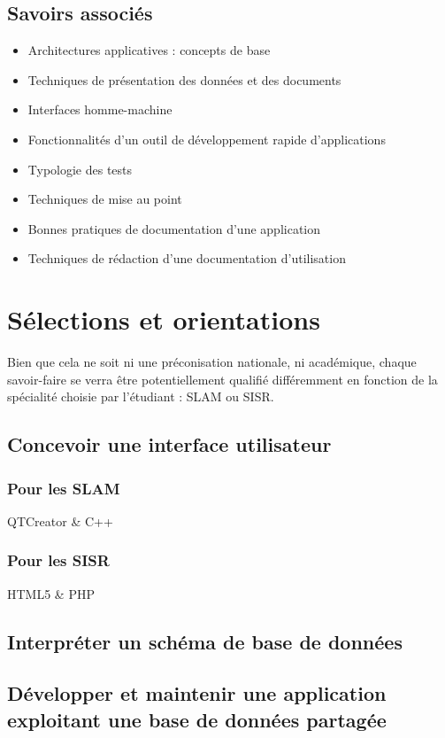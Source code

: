 \documentclass[12pt,a4paper,oneside,titlepage,final]{article}
\begin{document}
\subsection*{Savoirs associés}
\begin{itemize}
    \item Architectures applicatives : concepts de base
    \item Techniques de présentation des données et des documents
    \item Interfaces homme-machine
    \item Fonctionnalités d'un outil de développement rapide
    d'applications
    \item Typologie des tests
    \item Techniques de mise au point
    \item Bonnes pratiques de documentation d'une application
    \item Techniques de rédaction d'une documentation d'utilisation
\end{itemize}


\section{Sélections et orientations}
Bien que cela ne soit ni une préconisation nationale, ni académique,
chaque savoir-faire se verra être potentiellement qualifié
différemment en fonction de la spécialité choisie par l'étudiant :
\gls{SLAM} ou \gls{SISR}.

\subsection{Concevoir une interface utilisateur}
\subsubsection{Pour les \gls{SLAM}}
QTCreator \& C++
\subsubsection{Pour les \gls{SISR}}
HTML5 \& PHP

\subsection{Interpréter un schéma de base de données}

\subsection{Développer et maintenir une application exploitant une
  base de données partagée}
\end{document}
